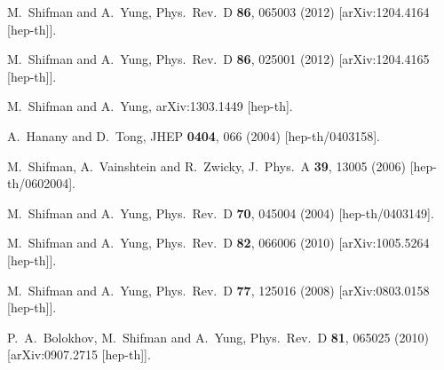 \documentclass[12pt]{article}
\begin{document}
\begin{thebibliography}{99}
  M.~Shifman and A.~Yung,
  Phys.\ Rev.\ D {\bf 86}, 065003 (2012)
  [arXiv:1204.4164 [hep-th]].

  M.~Shifman and A.~Yung,
  Phys.\ Rev.\ D {\bf 86}, 025001 (2012)
  [arXiv:1204.4165 [hep-th]].

  M.~Shifman and A.~Yung,
  arXiv:1303.1449 [hep-th].

  A.~Hanany and D.~Tong,
  JHEP {\bf 0404}, 066 (2004)
  [hep-th/0403158].

  M.~Shifman, A.~Vainshtein and R.~Zwicky,
  J.\ Phys.\ A {\bf 39}, 13005 (2006)
  [hep-th/0602004].

  M.~Shifman and A.~Yung,
  Phys.\ Rev.\ D {\bf 70}, 045004 (2004)
  [hep-th/0403149].

  M.~Shifman and A.~Yung,
  Phys.\ Rev.\ D {\bf 82}, 066006 (2010)
  [arXiv:1005.5264 [hep-th]].

  M.~Shifman and A.~Yung,
  Phys.\ Rev.\  D {\bf 77}, 125016 (2008)
  [arXiv:0803.0158 [hep-th]].

  P.~A.~Bolokhov, M.~Shifman and A.~Yung,
  Phys.\ Rev.\  D {\bf 81}, 065025 (2010)
  [arXiv:0907.2715 [hep-th]].
  
\end{thebibliography}
\end{document}
